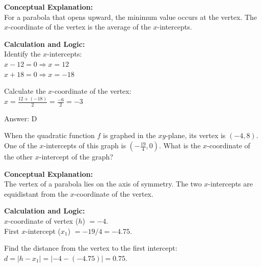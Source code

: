 \documentclass[11pt,paper=a4,answers]{exam}
\begin{document}
\begin{questions}
\begin{solution}
\textbf{Conceptual Explanation:} \\
For a parabola that opens upward, the minimum value occurs at the vertex. The $x$-coordinate of the vertex is the average of the $x$-intercepts.

\vspace{20pt}

\textbf{Calculation and Logic:} \\
Identify the $x$-intercepts: \\
$x - 12 = 0 \Rightarrow x = 12$ \\
$x + 18 = 0 \Rightarrow x = -18$

\vspace{10pt}

Calculate the $x$-coordinate of the vertex: \\
$x = \frac{12 + (-18)}{2} = \frac{-6}{2} = -3$

\vspace{25pt}

Answer: \colorbox{yellow!100}{D}
\end{solution}

\vspace{40pt}

\question
When the quadratic function $f$ is graphed in the $xy$-plane, its vertex is $(-4, 8)$. One of the $x$-intercepts of this graph is $(-\frac{19}{4}, 0)$. What is the $x$-coordinate of the other $x$-intercept of the graph?

\begin{solution}
\textbf{Conceptual Explanation:} \\
The vertex of a parabola lies on the axis of symmetry. The two $x$-intercepts are equidistant from the $x$-coordinate of the vertex.

\vspace{20pt}

\textbf{Calculation and Logic:} \\
$x$-coordinate of vertex ($h$) $= -4$. \\
First $x$-intercept ($x_1$) $= -19/4 = -4.75$.

\vspace{10pt}

Find the distance from the vertex to the first intercept: \\
$d = |h - x_1| = |-4 - (-4.75)| = 0.75$.

\vspace{10pt}


\end{solution}
\end{questions}
\end{document}
